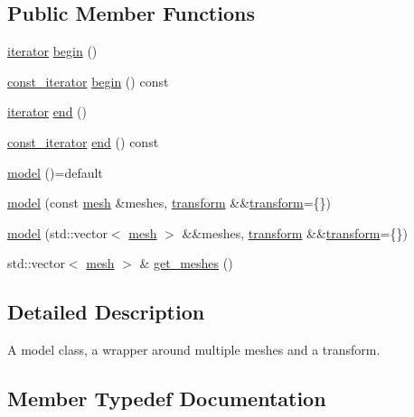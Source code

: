 \subsection*{Public Member Functions}
\begin{DoxyCompactItemize}
\item 
\mbox{\hyperlink{classmoka_1_1model_a2fa7c32a9fe64904609be78bb8d1abdf}{iterator}} \mbox{\hyperlink{classmoka_1_1model_a353f88ac48e7edf13ec5f37803c32b60}{begin}} ()
\item 
\mbox{\hyperlink{classmoka_1_1model_a2320ba22d7cfd04cd0bba753ab8e10a8}{const\+\_\+iterator}} \mbox{\hyperlink{classmoka_1_1model_a272fffdb8a114d785aaa9993377dce48}{begin}} () const
\item 
\mbox{\hyperlink{classmoka_1_1model_a2fa7c32a9fe64904609be78bb8d1abdf}{iterator}} \mbox{\hyperlink{classmoka_1_1model_a4a405fccf852e3dc82ce06440d131ecc}{end}} ()
\item 
\mbox{\hyperlink{classmoka_1_1model_a2320ba22d7cfd04cd0bba753ab8e10a8}{const\+\_\+iterator}} \mbox{\hyperlink{classmoka_1_1model_a315c37c8781daaef2f0fa3e8da2821da}{end}} () const
\item 
\mbox{\hyperlink{classmoka_1_1model_a0a521b47697304abea0e06655afa8fc8}{model}} ()=default
\item 
\mbox{\hyperlink{classmoka_1_1model_a9d2815c2585fe973590054e1d05f822a}{model}} (const \mbox{\hyperlink{classmoka_1_1mesh}{mesh}} \&meshes, \mbox{\hyperlink{classmoka_1_1transform}{transform}} \&\&\mbox{\hyperlink{classmoka_1_1transform}{transform}}=\{\})
\item 
\mbox{\hyperlink{classmoka_1_1model_a16c419b2c46e2198d3368f3c5d5f8d47}{model}} (std\+::vector$<$ \mbox{\hyperlink{classmoka_1_1mesh}{mesh}} $>$ \&\&meshes, \mbox{\hyperlink{classmoka_1_1transform}{transform}} \&\&\mbox{\hyperlink{classmoka_1_1transform}{transform}}=\{\})
\item 
std\+::vector$<$ \mbox{\hyperlink{classmoka_1_1mesh}{mesh}} $>$ \& \mbox{\hyperlink{classmoka_1_1model_a002567d771059e2a2c0666d276508f4b}{get\+\_\+meshes}} ()
\end{DoxyCompactItemize}


\subsection{Detailed Description}
A model class, a wrapper around multiple meshes and a transform. 

\subsection{Member Typedef Documentation}
\mbox{\label{classmoka_1_1model_a2320ba22d7cfd04cd0bba753ab8e10a8}} 
